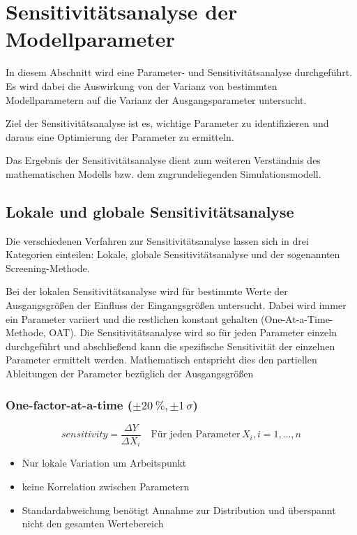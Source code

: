 \pagestyle{milan}
\section{Sensitivitätsanalyse der Modellparameter}\label{sec:sesitivitaetsanalyse}
In diesem Abschnitt wird eine Parameter- und Sensitivitätsanalyse durchgeführt. 
Es wird dabei die Auswirkung von der Varianz von bestimmten Modellparametern auf die Varianz der Ausgangsparameter untersucht.

Ziel der Sensitivitätsanalyse ist es, wichtige Parameter zu identifizieren und daraus eine Optimierung der Parameter zu ermitteln.

Das Ergebnis der Sensitivitätsanalyse dient zum weiteren Verständnis des mathematischen Modells bzw. dem zugrundeliegenden Simulationsmodell.
\subsection{Lokale und globale Sensitivitätsanalyse}

Die verschiedenen Verfahren zur Sensitivitätsanalyse lassen sich in drei Kategorien einteilen: Lokale, globale Sensitivitätsanalyse und der sogenannten Screening-Methode.

Bei der lokalen Sensitivitätsanalyse wird für bestimmte Werte der Ausgangsgrößen der Einfluss der Eingangsgrößen untersucht. Dabei wird immer ein Parameter variiert und die restlichen konstant gehalten (One-At-a-Time-Methode, OAT).
Die Sensitivitätsanalyse wird so für jeden Parameter einzeln durchgeführt und abschließend kann die spezifische Sensitivität der einzelnen Parameter ermittelt werden.
Mathematisch entspricht dies den partiellen Ableitungen der Parameter bezüglich der Ausgangsgrößen

\subsubsection*{One-factor-at-a-time ($\pm \SI{20}{\percent}, \pm 1\, \sigma$)}

\begin{equation}
    sensitivity=\frac{\Delta Y}{\Delta X_{i}} \quad \textrm{Für jeden Parameter}\,X_i, i=1,\dots,n
\end{equation}
\begin{itemize}
    \item Nur lokale Variation um Arbeitspunkt 
    \item keine Korrelation zwischen Parametern
    \item Standardabweichung benötigt Annahme zur Distribution und überspannt nicht den gesamten Wertebereich
\end{itemize}


